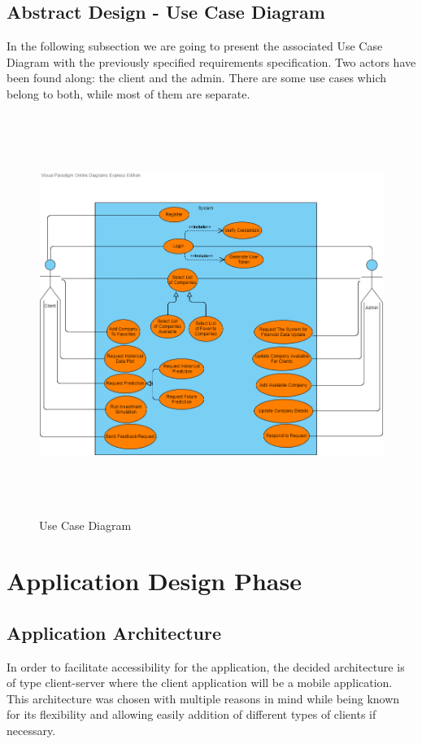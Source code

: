\subsection{Abstract Design - Use Case Diagram}
In the following subsection we are going to present the associated Use Case Diagram with the previously specified requirements specification. Two actors have been found along: the client and the admin. There are some use cases which belong to both, while most of them are separate.

\begin{figure}[H]
\centering
\includegraphics[height=13cm]{images/UseCaseDiagram.png} 
\caption{Use Case Diagram}
\label{fig:usecasediagram}
\end{figure}


\section{Application Design Phase}

\subsection{Application Architecture}
In order to facilitate accessibility for the application, the decided architecture is of type client-server where the client application will be a mobile application. This architecture was chosen with multiple reasons in mind while being known for its flexibility and allowing easily addition of different types of clients if necessary.

